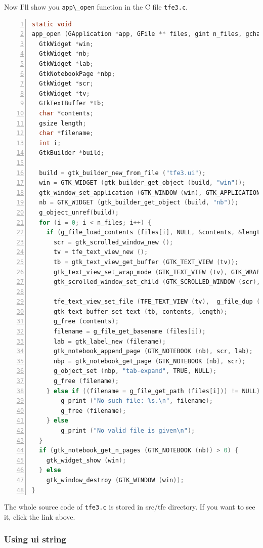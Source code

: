 Now I'll show you \passthrough{\lstinline!app\_open!} function in the C
file \passthrough{\lstinline!tfe3.c!}.

\begin{lstlisting}[language=C, numbers=left]
static void
app_open (GApplication *app, GFile ** files, gint n_files, gchar *hint, gpointer user_data) {
  GtkWidget *win;
  GtkWidget *nb;
  GtkWidget *lab;
  GtkNotebookPage *nbp;
  GtkWidget *scr;
  GtkWidget *tv;
  GtkTextBuffer *tb;
  char *contents;
  gsize length;
  char *filename;
  int i;
  GtkBuilder *build;

  build = gtk_builder_new_from_file ("tfe3.ui");
  win = GTK_WIDGET (gtk_builder_get_object (build, "win"));
  gtk_window_set_application (GTK_WINDOW (win), GTK_APPLICATION (app));
  nb = GTK_WIDGET (gtk_builder_get_object (build, "nb"));
  g_object_unref(build);
  for (i = 0; i < n_files; i++) {
    if (g_file_load_contents (files[i], NULL, &contents, &length, NULL, NULL)) {
      scr = gtk_scrolled_window_new ();
      tv = tfe_text_view_new ();
      tb = gtk_text_view_get_buffer (GTK_TEXT_VIEW (tv));
      gtk_text_view_set_wrap_mode (GTK_TEXT_VIEW (tv), GTK_WRAP_WORD_CHAR);
      gtk_scrolled_window_set_child (GTK_SCROLLED_WINDOW (scr), tv);

      tfe_text_view_set_file (TFE_TEXT_VIEW (tv),  g_file_dup (files[i]));
      gtk_text_buffer_set_text (tb, contents, length);
      g_free (contents);
      filename = g_file_get_basename (files[i]);
      lab = gtk_label_new (filename);
      gtk_notebook_append_page (GTK_NOTEBOOK (nb), scr, lab);
      nbp = gtk_notebook_get_page (GTK_NOTEBOOK (nb), scr);
      g_object_set (nbp, "tab-expand", TRUE, NULL);
      g_free (filename);
    } else if ((filename = g_file_get_path (files[i])) != NULL) {
        g_print ("No such file: %s.\n", filename);
        g_free (filename);
    } else
        g_print ("No valid file is given\n");
  }
  if (gtk_notebook_get_n_pages (GTK_NOTEBOOK (nb)) > 0) {
    gtk_widget_show (win);
  } else
    gtk_window_destroy (GTK_WINDOW (win));
}
\end{lstlisting}

The whole source code of \passthrough{\lstinline!tfe3.c!} is stored in
src/tfe directory. If you want to see it, click the link above.

\hypertarget{using-ui-string}{%
\subsubsection{Using ui string}\label{using-ui-string}}

